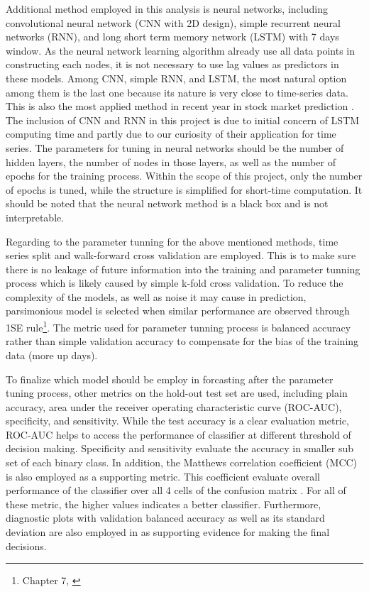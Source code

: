 \documentclass[11pt]{article}
\begin{document}
Additional method employed in this analysis is neural networks, including convolutional neural network (CNN with 2D design), simple recurrent neural networks (RNN), and long short term memory network (LSTM) with 7 days window. As the neural network learning algorithm already use all data points in constructing each nodes, it is not necessary to use lag values as predictors in these models. Among CNN, simple RNN, and LSTM, the most natural option among them is the last one because its nature is very close to time-series data. This is also the most applied method in recent year in stock market prediction \cite{KUMBURE_2022}. The inclusion of CNN and RNN in this project is due to initial concern of LSTM computing time and partly due to our curiosity of their application for time series. The parameters for tuning in neural networks should be the number of hidden layers, the number of nodes in those layers, as well as the number of epochs for the training process. Within the scope of this project, only the number of epochs is tuned, while the structure is simplified for short-time computation. It should be noted that the neural network method is a black box and is not interpretable. 

Regarding to the parameter tunning for the above mentioned methods, time series split and walk-forward cross validation are employed. This is to make sure there is no leakage of future information into the training and parameter tunning process which is likely caused by simple k-fold cross validation. To reduce the complexity of the models, as well as noise it may cause in prediction, parsimonious model is selected when similar performance are observed through 1SE rule\footnote{Chapter 7, \cite{ESL}}. The metric used for parameter tunning process is balanced accuracy rather than simple validation accuracy to compensate for the bias of the training data (more up days).

To finalize which model should be employ in forcasting after the parameter tuning process, other metrics on the hold-out test set are used, including plain accuracy, area under the receiver operating characteristic curve (ROC-AUC), specificity, and sensitivity. While the test accuracy is a clear evaluation metric, ROC-AUC helps to access the performance of classifier at different threshold of decision making. Specificity and sensitivity evaluate the accuracy in smaller sub set of each binary class. In addition, the Matthews correlation coefficient (MCC) is also employed as a supporting metric. This coefficient evaluate overall performance of the classifier over all 4 cells of the confusion matrix \cite{chicco_2020}. For all of these metric, the higher values indicates a better classifier. Furthermore, diagnostic plots with validation balanced accuracy as well as its standard deviation are also employed in as supporting evidence for making the final decisions.
\end{document}

